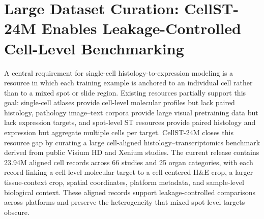 \documentclass[sigconf]{acmart}
\newcommand{\dataset}{CellST-24M\xspace}
\begin{document}
\section{Large Dataset Curation: \dataset{} Enables Leakage-Controlled Cell-Level Benchmarking}

A central requirement for single-cell histology-to-expression modeling is a resource in which each training example is anchored to an individual cell rather than to a mixed spot or slide region. Existing resources partially support this goal: single-cell atlases provide cell-level molecular profiles but lack paired histology, pathology image--text corpora provide large visual pretraining data but lack expression targets, and spot-level ST resources provide paired histology and expression but aggregate multiple cells per target. \dataset{} closes this resource gap by curating a large cell-aligned histology--transcriptomics benchmark derived from public Visium HD and Xenium studies. The current release contains 23.94M aligned cell records across 66 studies and 25 organ categories, with each record linking a cell-level molecular target to a cell-centered H\&E crop, a larger tissue-context crop, spatial coordinates, platform metadata, and sample-level biological context. These aligned records support leakage-controlled comparisons across platforms and preserve the heterogeneity that mixed spot-level targets obscure.
\end{document}
